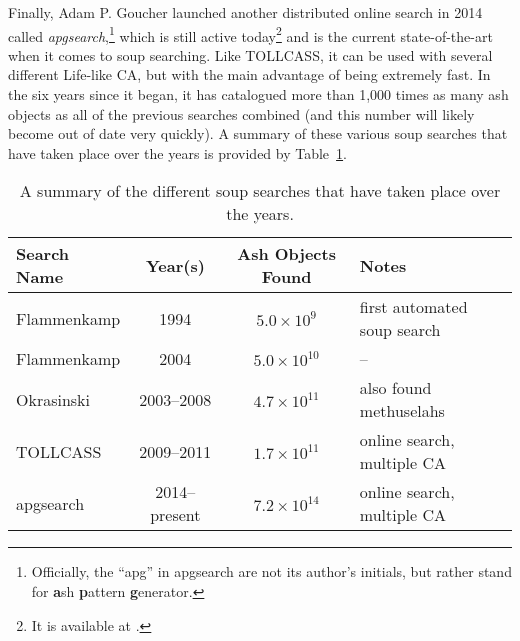 Finally, Adam P. Goucher launched another distributed online search in 2014 called \emph{apgsearch},\footnote{Officially, the ``apg'' in apgsearch are not its author's initials, but rather stand for \textbf{a}sh \textbf{p}attern \textbf{g}enerator.} which is still active today\footnote{It is available at .} and is the current state-of-the-art when it comes to soup searching. Like TOLLCASS, it can be used with several different Life-like CA, but with the main advantage of being extremely fast. In the six years since it began, it has catalogued more than 1,000 times as many ash objects as all of the previous searches combined (and this number will likely become out of date very quickly). A summary of these various soup searches that have taken place over the years is provided by Table~\ref{tab:ash_searches}.

\begin{table}[!htb]\vspace*{0.05in}
	\begin{center}		
		\begin{tabular}{l c c l}
			\toprule
			Search Name & Year(s) & Ash Objects Found & Notes \\ \midrule
			Flammenkamp & 1994 & $5.0 \times 10^9$ & first automated soup search \\
			\rowcolor{gray!20} Flammenkamp & 2004 & $5.0 \times 10^{10}$ & -- \\
			Okrasinski & 2003--2008 & $4.7 \times 10^{11}$ & also found methuselahs \\
			\rowcolor{gray!20} TOLLCASS & 2009--2011 & $1.7 \times 10^{11}$ & online search, multiple CA \\
			apgsearch & 2014--present & $7.2 \times 10^{14}$ & online search, multiple CA \\
			\bottomrule
		\end{tabular}
		\caption{A summary of the different soup searches that have taken place over the years.}\label{tab:ash_searches}
	\end{center}
\end{table}


\filbreak


